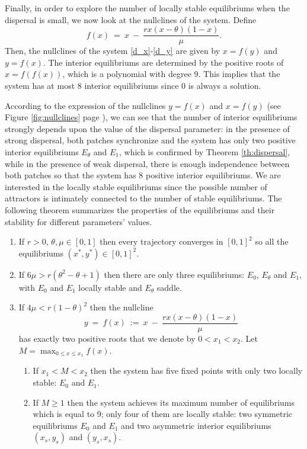 \indent Finally, in order to explore the number of locally stable equilibriums when the dispersal is small, we now look at the
 nullclines of the system. Define
 $$ f (x) \ = \ x \ - \ \frac{r x (x - \theta)(1 - x)}{\mu}. $$
 Then, the nullclines of the system \eqref{d_x}-\eqref{d_y} are given by $x = f(y)$ and $y = f(x)$.
 The interior equilibriums are determined by the positive roots of $x = f (f (x))$, which is a polynomial with degree 9.
 This implies that the system has at most 8 interior equilibriums since 0 is always a solution.

\indent According to the expression of the nullclines $y = f (x)$ and $x = f (y)$ (see Figure \ref{fig:nullclines}
 page \pageref{fig:nullclines}), we can see that the number of interior equilibriums strongly depends upon the value of the
 dispersal parameter: in the presence of strong dispersal, both patches synchronize and the system has only two positive interior
 equilibriums $E_{\theta}$ and $E_1$, which is confirmed by Theorem \ref{th:dispersal}, while in the presence of weak dispersal,
 there is enough independence between both patches so that the system has 8 positive interior equilibriums.
 We are interested in the locally stable equilibriums since the possible number of attractors is intimately connected to the number
 of stable equilibriums.
 The following theorem summarizes the properties of the equilibriums and their stability for different parameters' values.

\begin{theorem}
\label{th:attractors}
\begin{enumerate}
\item If $r > 0$, $\theta, \mu \in [0, 1]$ then every trajectory converges in $[0, 1]^2$ so all the equilibriums $(x^*, y^*) \in [0, 1]^2$. \vspace{4pt}
\item If $6 \mu > r (\theta^2 - \theta + 1)$ then there are only three equilibriums: $E_0$, $E_{\theta}$ and $E_1$, with
 $E_0$ and $E_1$ locally stable and $E_{\theta}$ saddle.\vspace{4pt}
\item If $4 \mu < r (1 - \theta)^2$ then the nullcline
 $$ y \ = \ f (x) \ := \ x \ - \ \frac{rx (x - \theta) (1 - x)}{\mu} $$
 has exactly two positive roots that we denote by $0 < x_1 < x_2$.
 Let $M = \max_{0 \leq x \leq x_1} f (x)$. \vspace{4pt}
\begin{enumerate}
\item If $x_1 < M < x_2$ then the system has five fixed points with only two locally stable: $E_0$ and $E_1$. \vspace{4pt}
\item If $M \geq 1$ then the system achieves its maximum number of equilibriums which is equal to 9;
 only four of them are locally stable: two symmetric equilibriums $E_0$ and $E_1$ and two asymmetric interior equilibriums $(x_s, y_s)$ and $(y_s, x_s)$.
\end{enumerate}
\end{enumerate}
\end{theorem}

